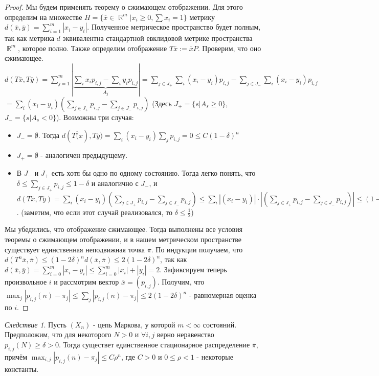 \documentclass[a4paper,100pt]{article}
\theoremstyle{indented}
\theoremstyle{definition}
\theoremstyle{remark}
\newtheorem{cons}{Следствие}
\DeclareMathOperator{\RR}{\mathbb{R}}
\begin{document}
\begin{proof}
  Мы будем применять теорему о сжимающем отображении. Для этого определим на множестве $H=\{\overline{x} \in \RR^m | x_i \geq 0, \sum x_i=1\}$ метрику $d(\overline{x}, \overline{y})=\sum_{i=1}^m |x_i-y_i|$. Полученное метрическое пространство будет полным, так как метрика $d$ эквивалентна стандартной евклидовой метрике пространства $\RR^m$, которое полно. Также определим отображение $T\overline{x} := \overline{x}P$. Проверим, что оно сжимающее. $d(T\overline{x}, T\overline{y})=\sum_{j=1}^m|\underbrace{\sum_{i}x_ip_{i, j} - \sum_{i}y_ip_{i, j}}_{A_j}|=\sum_{j \in J_+} \sum_{i}(x_i-y_i)p_{i, j}-\sum_{j \in J_-} \sum_{i}(x_i-y_i)p_{i, j}$ $=\sum_{i}(x_i-y_i)(\sum_{j \in J_+}p_{i, j}- \sum_{j \in J_-}p_{i, j})$ (Здесь $J_+=\{s | A_s \geq 0\}$, $J_-=\{s | A_s < 0\}$). Возможны три случая:
  \begin{itemize}
      \item $J_-=\emptyset$. Тогда $d(T\overline(x), T\overline{y})=\sum_{i}(x_i-y_i) \sum_{j}p_{i, j}=0 \leq C(1-\delta)^n$
      \item $J_+=\emptyset$ - аналогичен предыдущему.
      \item В $J_-$ и $J_+$ есть хотя бы одно по одному состоянию. Тогда легко понять, что $ \delta \leq \sum_{j \in J_+} p_{i, j} \leq 1-\delta$ и аналогично с $J_-$, и $d(T\overline{x}, T\overline{y})=\sum_{i}(x_i-y_i)(\sum_{j \in J_+}p_{i, j}- \sum_{j \in J_-}p_{i, j}) \leq \sum_{i}|(x_i-y_i)|\cdot |(\sum_{j \in J_+}p_{i, j}- \sum_{j \in J_-}p_{i, j})| \leq (1-2\delta)\sum_{i}|x_i-y_i| =(1-2\delta)d(\overline{x}, \overline{y})$. (заметим, что если этот случай реализовался, то $\delta \leq \frac{1}{2}$)
  \end{itemize}
  
  Мы убедились, что отображение сжимающее. Тогда выполнены все условия теоремы о сжимающем отображении, и в нашем метрическом пространстве существует единственная неподвижная точка $\overline{\pi}$. По индукции получаем, что $d(T^n\overline{x}, \overline{\pi}) \leq (1-2\delta)^nd(\overline{x}, \overline{\pi}) \leq 2(1-2\delta)^n$, так как $d(\overline{x}, \overline{y})=\sum_{i=0}^m|x_i-y_i| \leq \sum_{i=0}^m|x_i|+|y_i|=2$.
  Зафиксируем теперь произвольное $i$ и рассмотрим вектор $\overline{x}=(p_{i, j})$. Получим, что $\max_{j} |p_{i, j}(n)-\pi_j| \leq  \sum_j |p_{i, j}(n)-\pi_j| \leq 2(1-2\delta)^n$ - равномерная оценка по $i$.
 \end{proof}
  
\begin{cons}
  Пусть $(X_n)$ - цепь Маркова, у которой $m<\infty$ состояний. Предположим, что для некоторого $N>0$ и $\forall i, j$ верно неравенство  $p_{i, j}(N) \geq \delta>0$. Тогда существет единственное стационарное распределение $\overline{\pi}$, причём $\max_{i, j} |p_{i, j}(n)-\pi_j|  \leq C\rho^n$, где $C>0$ и $0\leq \rho <1$ - некоторые константы.
\end{cons}
\end{document}
